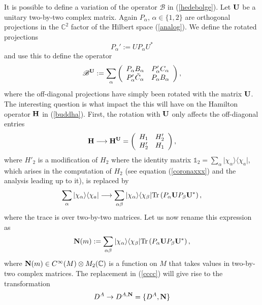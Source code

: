 \documentclass[12pt]{article}
\newcommand{\nn}{\nonumber}
\def\a{\alpha}
\def\b{\beta}
\begin{document}
It is possible to define a variation of the operator $\mathscr{B}$ in (\ref{hedebolge}).
Let ${\bf U}$ be a unitary two-by-two complex matrix. Again $P_\a$, $\a\in\{1,2\}$ are orthogonal projections in the $\mathbb{C}^2$ factor of the Hilbert space (\ref{analog}). We define the rotated projections 
$$
P_\a' := U P_\a U^*
$$
and use this to define the operator
\begin{eqnarray}
\mathscr{B}^{\bf U} :=  \sum_\a \left(
\begin{array}{cc}
 P_\a  B_\a  &     P_\a' C_\a \\ 
 P_\a' \tilde{C}_\a    &   P_\a  B_\a
\end{array}
\right),
\label{BDx222}
\end{eqnarray}
where the off-diagonal projections have simply been rotated with the matrix ${\bf U}$.
The interesting question is what impact the this will have on the Hamilton operator ${\bf H}$ in  (\ref{buddha}). First, the rotation with ${\bf U} $ only affects the off-diagonal entries 
\begin{eqnarray}
{\bf H}\longrightarrow {\bf H}^{\bf U}=
\left(
\begin{array}{cc}
H_{1}  &   H'_{2} \\
  H'_{2} &  {H}_{1} 
\end{array}
\right),
\nn
\end{eqnarray}
where $H'_{2}$ is a modification of $H_2$ where the identity matrix $\mathds{1}_2 = \sum_\a \vert \chi_\a \rangle \langle \chi_a\vert $, which arises in the computation of $H_2$ (see equation (\ref{coronaxxx}) and the analysis leading up to it), is replaced by
\begin{equation}
\sum_\a \vert \chi_\a \rangle \langle \chi_a \vert
\longrightarrow
    \sum_{\a\b} \vert \chi_\a \rangle \langle \chi_\b \vert \mbox{Tr}\left( P_\a  {\bf U} P_\b  {\bf U}^*   \right),
    \label{cccc}
\end{equation}
where the trace is over two-by-two matrices. Let us now rename this expression as
\begin{equation}
 {\bf N}(m):=    \sum_{\a\b} \vert \chi_\a \rangle \langle \chi_\b \vert \mbox{Tr}\left( P_\a {\bf U} P_\b  {\bf U}^* \right) ,
\end{equation}
where $ {\bf N}(m)\in C^\infty(M)\otimes M_2(\mathbb{C})$ is a function on $M$ that takes values in two-by-two complex matrices. The replacement in (\ref{cccc}) will give rise to the transformation
\begin{equation}
D^A\rightarrow D^{A,{\bf N}} = \{D^A, {\bf N}\}
\label{Maja}
\end{equation}
\end{document}
